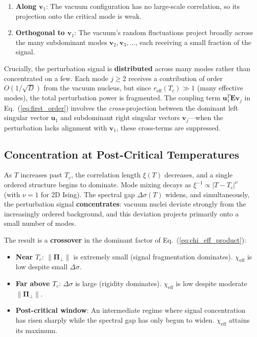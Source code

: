 \documentclass[aps,prl,twocolumn,superscriptaddress,byrevtex]{article}
\begin{document}
\begin{enumerate}
\item \textbf{Along $\mathbf{v}_1$}: The vacuum configuration has no large-scale correlation, so its projection onto the critical mode is weak.
\item \textbf{Orthogonal to $\mathbf{v}_1$}: The vacuum's random fluctuations project broadly across the many subdominant modes $\mathbf{v}_2, \mathbf{v}_3, \ldots$, each receiving a small fraction of the signal.
\end{enumerate}

Crucially, the perturbation signal is \textbf{distributed} across many modes rather than concentrated on a few. Each mode $j \geq 2$ receives a contribution of order $O(1/\sqrt{D})$ from the vacuum nucleus, but since $r_{\text{eff}}(T_c) \gg 1$ (many effective modes), the total perturbation power is fragmented. The coupling term $\mathbf{u}_1^T \mathbf{E} \mathbf{v}_j$ in Eq.~(\ref{eq:first_order}) involves the \emph{cross}-projection between the dominant left singular vector $\mathbf{u}_1$ and subdominant right singular vectors $\mathbf{v}_j$---when the perturbation lacks alignment with $\mathbf{v}_1$, these cross-terms are suppressed.

\subsection{Concentration at Post-Critical Temperatures}

As $T$ increases past $T_c$, the correlation length $\xi(T)$ decreases, and a single ordered structure begins to dominate. Mode mixing decays as $\xi^{-1} \propto |T - T_c|^{\nu}$ (with $\nu = 1$ for 2D Ising). The spectral gap $\Delta\sigma(T)$ widens, and simultaneously, the perturbation signal \textbf{concentrates}: vacuum nuclei deviate strongly from the increasingly ordered background, and this deviation projects primarily onto a small number of modes.

The result is a \textbf{crossover} in the dominant factor of Eq.~(\ref{eq:chi_eff_product}):

\begin{itemize}
\item \textbf{Near $T_c$}: $\|\boldsymbol{\Pi}_\perp\|$ is extremely small (signal fragmentation dominates). $\chi_{\text{eff}}$ is low despite small $\Delta\sigma$.
\item \textbf{Far above $T_c$}: $\Delta\sigma$ is large (rigidity dominates). $\chi_{\text{eff}}$ is low despite moderate $\|\boldsymbol{\Pi}_\perp\|$.
\item \textbf{Post-critical window}: An intermediate regime where signal concentration has risen sharply while the spectral gap has only begun to widen. $\chi_{\text{eff}}$ attains its maximum.
\end{itemize}
\end{document}
